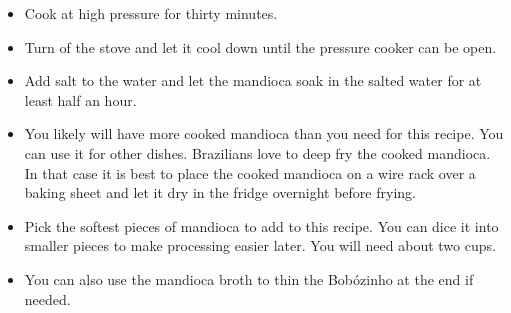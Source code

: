 \documentclass[11pt,letterpaper]{article}
\begin{document}
\begin{description}
\begin{enumerate}
\begin{itemize}
	\item Cook at high pressure for thirty minutes.
	\item Turn of the stove and let it cool down until the pressure cooker can be open.
	\item Add salt to the water and let the mandioca soak in the salted water for at least half an hour.
	\item You likely will have more cooked mandioca than you need for this recipe. You can use it for other dishes. Brazilians love to deep fry the cooked mandioca. In that case it is best to place the cooked mandioca on a wire rack over a baking sheet and let it dry in the fridge overnight before frying.
	\item Pick the softest pieces of mandioca to add to this recipe. You can dice it into smaller pieces to make processing easier later. You will need about two cups.
	\item You can also use the mandioca broth to thin the Bob\'ozinho at the end if needed.
	\end{itemize}


\end{enumerate}
\end{description}
\end{document}
